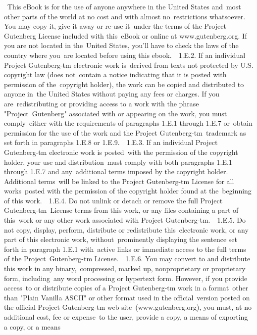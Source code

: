 {\
  This eBook is for the use of anyone anywhere in the United States and\
  most other parts of the world at no cost and with almost no\
  restrictions whatsoever. You may copy it, give it away or re-use it\
  under the terms of the Project Gutenberg License included with this\
  eBook or online at www.gutenberg.org. If you are not located in the\
  United States, you'll have to check the laws of the country where you\
  are located before using this ebook.\
\
1.E.2. If an individual Project Gutenberg-tm electronic work is\
derived from texts not protected by U.S. copyright law (does not\
contain a notice indicating that it is posted with permission of the\
copyright holder), the work can be copied and distributed to anyone in\
the United States without paying any fees or charges. If you are\
redistributing or providing access to a work with the phrase "Project\
Gutenberg" associated with or appearing on the work, you must comply\
either with the requirements of paragraphs 1.E.1 through 1.E.7 or\
obtain permission for the use of the work and the Project Gutenberg-tm\
trademark as set forth in paragraphs 1.E.8 or 1.E.9.\
\
1.E.3. If an individual Project Gutenberg-tm electronic work is posted\
with the permission of the copyright holder, your use and distribution\
must comply with both paragraphs 1.E.1 through 1.E.7 and any\
additional terms imposed by the copyright holder. Additional terms\
will be linked to the Project Gutenberg-tm License for all works\
posted with the permission of the copyright holder found at the\
beginning of this work.\
\
1.E.4. Do not unlink or detach or remove the full Project Gutenberg-tm\
License terms from this work, or any files containing a part of this\
work or any other work associated with Project Gutenberg-tm.\
\
1.E.5. Do not copy, display, perform, distribute or redistribute this\
electronic work, or any part of this electronic work, without\
prominently displaying the sentence set forth in paragraph 1.E.1 with\
active links or immediate access to the full terms of the Project\
Gutenberg-tm License.\
\
1.E.6. You may convert to and distribute this work in any binary,\
compressed, marked up, nonproprietary or proprietary form, including\
any word processing or hypertext form. However, if you provide access\
to or distribute copies of a Project Gutenberg-tm work in a format\
other than "Plain Vanilla ASCII" or other format used in the official\
version posted on the official Project Gutenberg-tm web site\
(www.gutenberg.org), you must, at no additional cost, fee or expense\
to the user, provide a copy, a means of exporting a copy, or a means\
}
